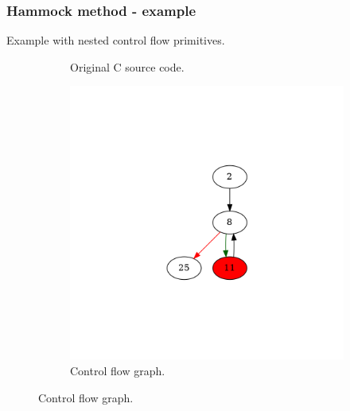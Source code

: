 \documentclass[aspectratio=1610]{beamer}
\begin{document}
\begin{frame}[noframenumbering]
	\frametitle{Hammock method - example}
	Example with nested control flow primitives.
	\begin{figure}[htbp]
		\centering
		\begin{subfigure}[b]{0.30\textwidth}
			\centering
			
			\caption{Original C source code.}
		\end{subfigure}
		\begin{subfigure}[b]{0.50\textwidth}
			\centering
			\includegraphics[height=0.6\paperheight]{inc/methods/hammock/example/without-break/main_0002b.png}
			\caption{Control flow graph.}
		\end{subfigure}
	\end{figure}
\end{frame}
\end{document}
